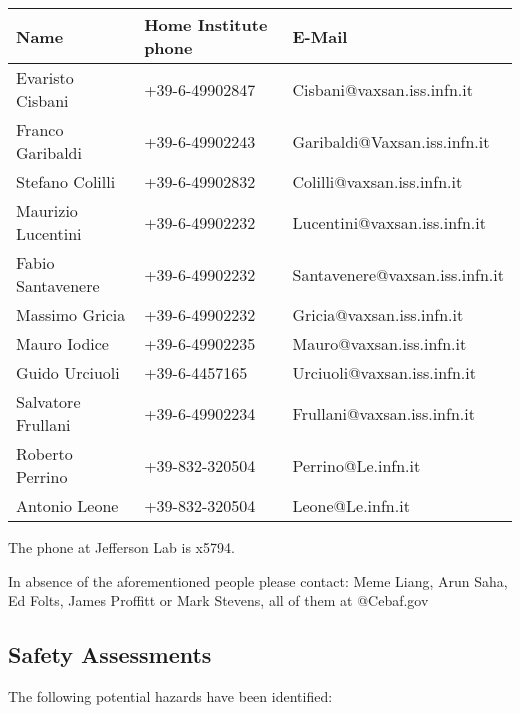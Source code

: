 \begin{center}
\begin{tabular}{l l l}
Name & Home Institute phone & E-Mail \\
\hline
Evaristo Cisbani & +39-6-49902847& Cisbani@vaxsan.iss.infn.it\\
Franco Garibaldi & +39-6-49902243& Garibaldi@Vaxsan.iss.infn.it\\
Stefano Colilli & +39-6-49902832 &Colilli@vaxsan.iss.infn.it\\
Maurizio Lucentini& +39-6-49902232 &Lucentini@vaxsan.iss.infn.it\\
Fabio Santavenere & +39-6-49902232& Santavenere@vaxsan.iss.infn.it\\
Massimo Gricia & +39-6-49902232 &Gricia@vaxsan.iss.infn.it\\
Mauro Iodice & +39-6-49902235 &Mauro@vaxsan.iss.infn.it\\
Guido Urciuoli & +39-6-4457165 &Urciuoli@vaxsan.iss.infn.it\\
Salvatore Frullani & +39-6-49902234 &Frullani@vaxsan.iss.infn.it\\
Roberto Perrino & +39-832-320504 &Perrino@Le.infn.it\\
Antonio Leone & +39-832-320504 & Leone@Le.infn.it\\
\hline
\end{tabular}
\end{center}

The phone at Jefferson Lab is x5794.

In absence of the aforementioned people please contact:
Meme Liang, Arun Saha, Ed Folts, James Proffitt or Mark Stevens, all of them at @Cebaf.gov

\subsection{Safety Assessments}
	
The following potential hazards have been identified: 


